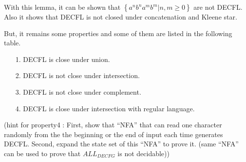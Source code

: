 \documentclass{article}
\begin{document}
\begin{itemize}
            With this lemma, it can be shown that $\left\{ a^{n}b^{n}a^{m}b^{m} | n,m \geq 0 \right\}$ are not DECFL. Also it shows that DECFL is not closed under concatenation and Kleene star.
            
            But, it remains some properties and some of them are listed in the following table.
            \begin{itemize}
						\item[1. ] DECFL is close under union.
						\item[2. ] DECFL is not close under intersection.
						\item[3. ] DECFL is not close under complement.
						\item[4. ] DECFL is close under intersection with regular language.
					\end{itemize}
            (hint for property4 : First, show that ``NFA'' that can read one character randomly from the the beginning or the end of input each time generates DECFL. Second, expand the state set of this ``NFA'' to prove it. (same ``NFA'' can be used to prove that $ALL_{DECFG}$ is not decidable))
            
            
    \end{itemize}

    
\end{document}
